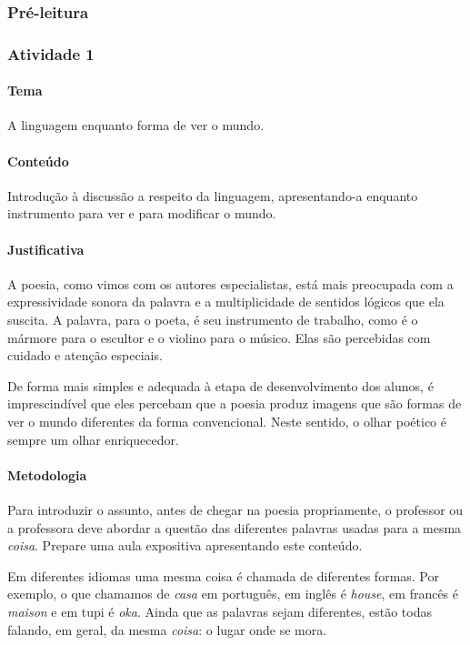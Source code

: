 \documentclass[11pt]{extarticle}
\begin{document}
\subsubsection{Pré-leitura}


\subsubsection{Atividade 1}

\paragraph{Tema} A linguagem enquanto forma de ver o mundo. 

\paragraph{Conteúdo} Introdução à discussão a respeito da 
linguagem, apresentando-a enquanto instrumento para ver e
para modificar o mundo.

\paragraph{Justificativa} A poesia, como vimos com os autores especialistas,
está mais preocupada com a expressividade sonora da palavra e a multiplicidade
de sentidos lógicos que ela suscita. A palavra, para o poeta,
é seu instrumento de trabalho, como é o mármore para o escultor
e o violino para o músico. Elas são percebidas com cuidado e atenção
especiais. 

De forma mais simples e adequada à etapa de desenvolvimento dos alunos,
é imprescindível que eles percebam que a poesia produz imagens 
que são formas de ver o mundo diferentes da forma convencional.
Neste sentido, o olhar poético é sempre um olhar enriquecedor. 

\paragraph{Metodologia} Para introduzir o assunto, antes de chegar na poesia
propriamente, o professor ou a professora deve abordar a questão das
diferentes palavras usadas para a mesma \textit{coisa}. 
Prepare uma aula expositiva apresentando este conteúdo. 

Em diferentes idiomas uma mesma coisa é chamada de diferentes formas.
Por exemplo, o que chamamos de \textit{casa} em português, em inglês 
é \textit{house}, em francês é \textit{maison} e em tupi é \textit{oka}. 
Ainda que as palavras sejam diferentes, estão todas falando, em geral, 
da mesma \textit{coisa}: o lugar onde se mora. 
\end{document}
